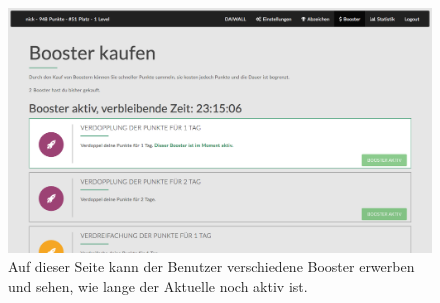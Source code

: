 \documentclass[12pt,twoside]{book}
\begin{document}
\begin{figure}[htbp]
    \centering
    \includegraphics[width=1.0\textwidth]{images/infoboard_booster.png}
    \caption{Auf dieser Seite kann der Benutzer verschiedene Booster erwerben und sehen, wie lange der Aktuelle noch aktiv ist.}
    \label{fig:booster}
\end{figure}
\end{document}
